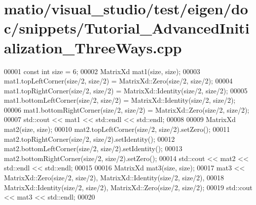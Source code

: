 \hypertarget{matio_2visual__studio_2test_2eigen_2doc_2snippets_2_tutorial___advanced_initialization___three_ways_8cpp_source}{}\section{matio/visual\+\_\+studio/test/eigen/doc/snippets/\+Tutorial\+\_\+\+Advanced\+Initialization\+\_\+\+Three\+Ways.cpp}
\label{matio_2visual__studio_2test_2eigen_2doc_2snippets_2_tutorial___advanced_initialization___three_ways_8cpp_source}

\begin{DoxyCode}
00001 \textcolor{keyword}{const} \textcolor{keywordtype}{int} size = 6;
00002 MatrixXd mat1(size, size);
00003 mat1.topLeftCorner(size/2, size/2)     = MatrixXd::Zero(size/2, size/2);
00004 mat1.topRightCorner(size/2, size/2)    = MatrixXd::Identity(size/2, size/2);
00005 mat1.bottomLeftCorner(size/2, size/2)  = MatrixXd::Identity(size/2, size/2);
00006 mat1.bottomRightCorner(size/2, size/2) = MatrixXd::Zero(size/2, size/2);
00007 std::cout << mat1 << std::endl << std::endl;
00008 
00009 MatrixXd mat2(size, size);
00010 mat2.topLeftCorner(size/2, size/2).setZero();
00011 mat2.topRightCorner(size/2, size/2).setIdentity();
00012 mat2.bottomLeftCorner(size/2, size/2).setIdentity();
00013 mat2.bottomRightCorner(size/2, size/2).setZero();
00014 std::cout << mat2 << std::endl << std::endl;
00015 
00016 MatrixXd mat3(size, size);
00017 mat3 << MatrixXd::Zero(size/2, size/2), MatrixXd::Identity(size/2, size/2),
00018         MatrixXd::Identity(size/2, size/2), MatrixXd::Zero(size/2, size/2);
00019 std::cout << mat3 << std::endl;
00020 
\end{DoxyCode}
